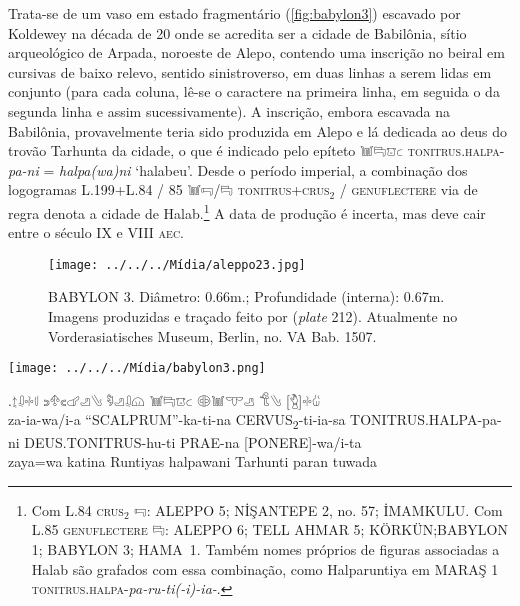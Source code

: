 Trata-se de um vaso em estado fragmentário (\autoref{fig:babylon3}) escavado por
Koldewey na década de 20 onde se acredita ser a cidade de Babilônia, sítio
arqueológico de Arpada, noroeste de Alepo, contendo uma inscrição no
beiral em cursivas de baixo relevo, sentido sinistroverso, em duas linhas a
serem lidas em conjunto (para cada coluna, lê-se o caractere na primeira linha,
em seguida o da segunda linha e assim sucessivamente).
A inscrição, embora escavada na Babilônia, provavelmente teria sido
produzida em Alepo e lá dedicada ao deus do trovão Tarhunta da cidade, o que é
indicado pelo epíteto 𔓢𔑞𔕸𔗐 \textsc{tonitrus.halpa}-\textit{pa-ni}
= \textit{halpa{(wa)}ni} `halabeu'. Desde o período imperial,
a combinação dos logogramas L.199+L.84 \slash{} 85 𔓢𔑝\slash{}𔑞
\textsc{tonitrus+crus$_2$ \slash{} genuflectere}
via de regra denota a cidade de Halab.\footnote{Com L.84
\textsc{crus}$_2$ 𔑝: ALEPPO 5; NİŞANTEPE 2, no. 57; İMAMKULU.\@
Com L.85 \textsc{genuflectere} 𔑞:  ALEPPO 6; TELL AHMAR 5;
KÖRKÜN;\@ BABYLON 1; BABYLON 3; \mbox{HAMA 1}.\@
Também nomes próprios de figuras associadas a Halab são grafados com essa
combinação, como Halparuntiya em
MARAŞ 1 \textsc{tonitrus.halpa}-\textit{pa-ru-ti{(-i)}-ia-}.
}
A data de produção é incerta, mas deve cair entre o século IX e VIII
\textsc{aec}.

\vfill

\begin{figure}[!htb]
	\texttt{[image: ../../../Mídia/aleppo23.jpg]}
	\caption[BABYLON 3]{
		BABYLON 3. Diâmetro: 0.66m.; Profundidade
		(interna): 0.67m. Imagens produzidas e traçado feito por
		 (\emph{plate} 212). Atualmente no
		\foreignlanguage{german}{Vorderasiatisches Museum}, Berlin,
		no. VA Bab. 1507.
	}\label{fig:babylon3}
\end{figure}

\clearpage

\begin{center}
	\texttt{[image: ../../../Mídia/babylon3.png]}
\end{center}
\exg.{\Large 𔖪𔓱𔗬𔗷} {\Large 𔗎𔔯𔗏𔗧𔑣𔐤} {\Large 𔑵𔑣𔓱𔗔} {\Large 𔓢𔑞𔕸𔗐} {\Large 𔖖𔓢𔕙𔑣}
{\Large 𔐎𔐤} {\Large [𔑇]𔗬𔑰}\\
za-ia-wa\slash{}i-a\hspace{10pt} ``SCALPRUM''-ka-ti-na\hspace{10pt}
CERVUS\textsubscript{2}-ti-ia-sa\hspace{10pt} TONITRUS.HALPA-pa-ni\hspace{10pt}
DEUS.TONITRUS-hu-ti\hspace{10pt} PRAE-na\hspace{10pt} [PONERE]-wa/i-ta\\
zaya=wa katina Runtiyas halpawani Tarhunti paran tuwada

